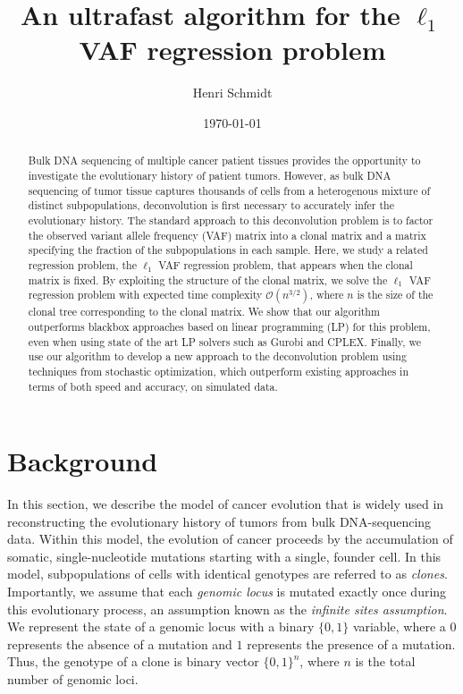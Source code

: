 \documentclass[10pt]{article}
\title{An ultrafast algorithm for the $\ell_1$ VAF regression problem}
\author{Henri Schmidt}
\date{\today}
\begin{document}
\maketitle

\begin{abstract}
    Bulk DNA sequencing of multiple cancer patient tissues provides the opportunity to 
    investigate the evolutionary history of patient tumors. However, as bulk DNA sequencing
    of tumor tissue captures thousands of cells from a heterogenous mixture of 
    distinct subpopulations, deconvolution is first necessary to accurately infer the 
    evolutionary history. The standard approach to this deconvolution problem is to 
    factor the observed variant allele frequency (VAF) matrix into a
    clonal matrix and a matrix specifying the fraction of the subpopulations in each sample. 
    Here, we study a related regression problem, the $\ell_1$ VAF regression problem, that appears 
    when the clonal matrix is fixed. By exploiting the structure of the clonal
    matrix, we solve the $\ell_1$ VAF regression problem with expected time complexity
    $\mathcal{O}(n^{3/2})$, where $n$ is the size of the clonal tree corresponding to 
    the clonal matrix. We show that our algorithm outperforms blackbox approaches based on
    linear programming (LP) for this problem, even when using state of the art LP solvers such
    as Gurobi and CPLEX. Finally, we use our algorithm to develop a new approach to the deconvolution
    problem using techniques from stochastic optimization, which outperform existing approaches
    in terms of both speed and accuracy, on simulated data.
\end{abstract}

\section{Background}

In this section, we describe the model of cancer evolution that is widely used 
\cite{malikic_clonality_2015, el-kebir_reconstruction_2015, deshwar_phylowgs_2015, 
satas_tumor_2017, myers_calder_2019, wintersinger_reconstructing_2022} 
in reconstructing the evolutionary history of tumors from bulk DNA-sequencing data. Within this model,
the evolution of cancer proceeds by the accumulation of somatic, single-nucleotide
mutations starting with a single, founder cell. 
In this model, subpopulations of cells with identical genotypes are referred to as \emph{clones}.
Importantly, we assume that each \emph{genomic locus} is mutated exactly
once during this evolutionary process, an assumption known as the \emph{infinite sites assumption}. We
represent the state of a genomic locus with a binary $\{0, 1\}$ variable, where a $0$ represents the absence 
of a mutation and $1$ represents the presence of a mutation. Thus, the genotype of a clone is binary vector 
$\{0, 1\}^n$, where $n$ is the total number of genomic loci.
\end{document}
